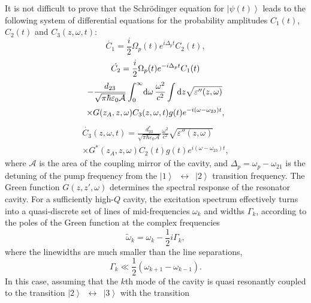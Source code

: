 \documentclass[pra, twocolumn]{revtex4}
\newcommand{\D}{\mbox{\rm d}}
\newcommand{\ket}[1]{$\left|#1\right\rangle$}
\begin{document}
It is not difficult to prove
that the Schr\"odinger equation for
\ket{\psi(t)}
leads to the following system of
differential
equations for the probability amplitudes
$C_1(t)$, $C_2(t)$ and $C_3(z, \omega, t)$:
\begin{equation}
  \label{1.19}
  \dot {C_1} =
      \frac{i}{2}
\Omega_p
(t)
      e^{i\Delta_pt}
      C_2(t),
\end{equation}
\begin{multline}
 \label{1.20}
 \dot {C_2} =
 \frac{i}{2}
\Omega_p
(t)
      e^{-i\Delta_pt}
      C_1(t)
\\[.5ex]
      -\frac{d_{23}}{\sqrt{\pi \hbar \varepsilon _0  \mathcal{A}}}
      \int_0^\infty\! \D\omega\, \frac{\omega ^2}{c^2}
      \int \D z
      \sqrt{\varepsilon''(z,\omega)}\,
\\[.5ex]
 \times
      G(z_A, z,\omega)
      C_3(z, \omega, t)g(t)
      e^{-i (\omega - \omega_{23})t},
\end{multline}
\begin{multline}
  \label{1.18}
 \dot {C_3}(z, \omega, t) =
      \frac{d_{23}^*}{\sqrt{\pi \hbar \varepsilon _0  \mathcal{A}}}
      \frac{\omega ^2}{c^2}
       \sqrt{\varepsilon''(z,\omega)}\,
\\[.5ex]
\times
      G^*(z_A, z,\omega)
      C_2(t)g(t)
      e^{i (\omega - \omega_{23})t},
\end{multline}
where $\mathcal{A}$ is the area
of the coupling mirror of the cavity,
and $\Delta_p=\omega_p-\omega_{21}$
is the detuning of
the pump frequency
from the \mbox{\ket{1} $\!\leftrightarrow$ \!\ket{2}} transition
frequency.
The Green function $G(z,z',\omega)$ determines the spectral response
of the resonator cavity. For a
sufficiently high-$Q$ cavity, the excitation spectrum effectively turns into
a quasi-discrete set of lines of mid-frequencies $\omega_k$
and widths $\Gamma_k$, according to the poles of the
Green function at the complex frequencies
\begin{equation}
  \label{1.21}
    \tilde{\omega}_k
    = \omega_{k}
      - {\textstyle\frac {1} {2}}i\Gamma _{k},
\end{equation}
where the linewidths are much smaller than the
line separations,
\begin{equation}
\label{1.30-1}
\Gamma_k \ll {\textstyle\frac{1}{2}}(\omega_{k+1} - \omega_{k-1}).
\end{equation}
In this case, assuming that the $k$th mode of the cavity is quasi
resonantly coupled to the transition
\mbox{\ket{2} $\!\leftrightarrow$ \!\ket{3}} with the transition
\end{document}
